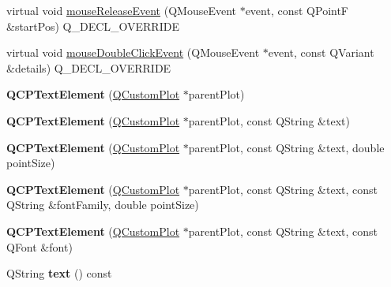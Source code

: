 \begin{DoxyCompactItemize}
\item 
virtual void \hyperlink{class_q_c_p_text_element_acfcbaf9b1da18745e72726aafb39c855}{mouse\+Release\+Event} (Q\+Mouse\+Event $\ast$event, const Q\+PointF \&start\+Pos) Q\+\_\+\+D\+E\+C\+L\+\_\+\+O\+V\+E\+R\+R\+I\+DE
\item 
virtual void \hyperlink{class_q_c_p_text_element_a2272ff775ab385f612e9fd39773de7c0}{mouse\+Double\+Click\+Event} (Q\+Mouse\+Event $\ast$event, const Q\+Variant \&details) Q\+\_\+\+D\+E\+C\+L\+\_\+\+O\+V\+E\+R\+R\+I\+DE
\item 
{\bfseries Q\+C\+P\+Text\+Element} (\hyperlink{class_q_custom_plot}{Q\+Custom\+Plot} $\ast$parent\+Plot)\hypertarget{class_q_c_p_text_element_ae1de18bdb1e7ba959f132018dd9a0258}{}\label{class_q_c_p_text_element_ae1de18bdb1e7ba959f132018dd9a0258}

\item 
{\bfseries Q\+C\+P\+Text\+Element} (\hyperlink{class_q_custom_plot}{Q\+Custom\+Plot} $\ast$parent\+Plot, const Q\+String \&text)\hypertarget{class_q_c_p_text_element_a00f08a8a3363ad8d7d12ca0db4922b6b}{}\label{class_q_c_p_text_element_a00f08a8a3363ad8d7d12ca0db4922b6b}

\item 
{\bfseries Q\+C\+P\+Text\+Element} (\hyperlink{class_q_custom_plot}{Q\+Custom\+Plot} $\ast$parent\+Plot, const Q\+String \&text, double point\+Size)\hypertarget{class_q_c_p_text_element_a2684e65def4a5daf80be9f5f149ca9b2}{}\label{class_q_c_p_text_element_a2684e65def4a5daf80be9f5f149ca9b2}

\item 
{\bfseries Q\+C\+P\+Text\+Element} (\hyperlink{class_q_custom_plot}{Q\+Custom\+Plot} $\ast$parent\+Plot, const Q\+String \&text, const Q\+String \&font\+Family, double point\+Size)\hypertarget{class_q_c_p_text_element_adb4bcd3743dbfabfedee4fe9c2ee93da}{}\label{class_q_c_p_text_element_adb4bcd3743dbfabfedee4fe9c2ee93da}

\item 
{\bfseries Q\+C\+P\+Text\+Element} (\hyperlink{class_q_custom_plot}{Q\+Custom\+Plot} $\ast$parent\+Plot, const Q\+String \&text, const Q\+Font \&font)\hypertarget{class_q_c_p_text_element_a00b75787b77b39bbd083813c2a7b2520}{}\label{class_q_c_p_text_element_a00b75787b77b39bbd083813c2a7b2520}

\item 
Q\+String {\bfseries text} () const \hypertarget{class_q_c_p_text_element_a472eed865d08fb01da6b1e917afa0fdb}{}\label{class_q_c_p_text_element_a472eed865d08fb01da6b1e917afa0fdb}


\end{DoxyCompactItemize}
